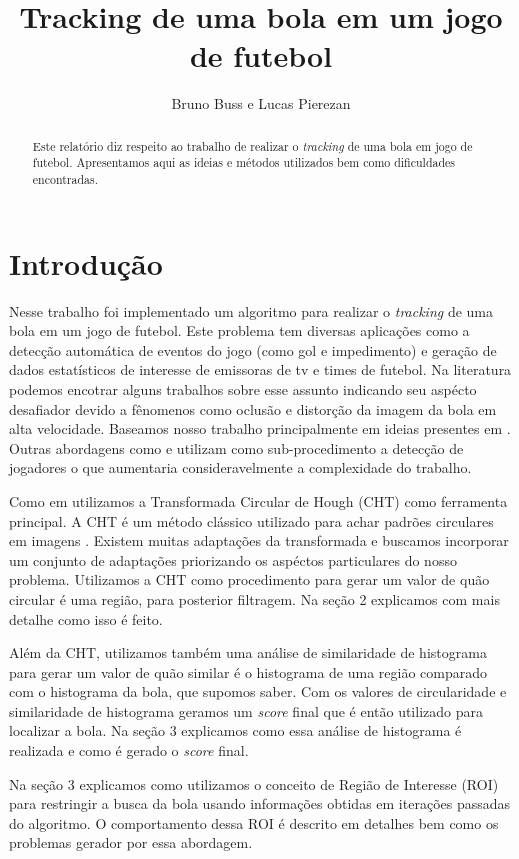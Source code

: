 \documentclass[11pt,a4paper]{article}
\title{Tracking de uma bola em um jogo de futebol}
\author{Bruno Buss e Lucas Pierezan}
\begin{document}
\maketitle

\begin{abstract}
 Este relatório diz respeito ao trabalho de realizar o \textit{tracking} de uma bola em jogo de futebol. Apresentamos aqui as ideias e métodos utilizados bem como dificuldades encontradas.
\end{abstract}

\section{Introdução}
 Nesse trabalho foi implementado um algoritmo para realizar o \textit{tracking} de uma bola em um jogo de futebol. Este problema tem diversas aplicações como a detecção automática de eventos do jogo (como gol e impedimento) e geração de dados estatísticos de interesse de emissoras de tv e times de futebol. Na literatura podemos encotrar alguns trabalhos sobre esse assunto \cite{}\cite{}\cite{} indicando seu aspécto desafiador devido a fênomenos como oclusão e distorção da imagem da bola em alta velocidade. Baseamos nosso trabalho principalmente em ideias presentes em \cite{}. Outras abordagens como \cite{} e \cite{} utilizam como sub-procedimento a detecção de jogadores o que aumentaria consideravelmente a complexidade do trabalho.

Como em \cite{} utilizamos a Transformada Circular de Hough (CHT) como ferramenta principal. A CHT é um método clássico utilizado para achar padrões circulares em imagens \cite{}. Existem muitas adaptações da transformada\cite{} e buscamos incorporar um conjunto de adaptações priorizando os aspéctos particulares do nosso problema. Utilizamos a CHT como procedimento para gerar um valor de quão circular é uma região, para posterior filtragem. Na seção 2 explicamos com mais detalhe como isso é feito.

Além da CHT, utilizamos também uma análise de similaridade de histograma para gerar um valor de quão similar é o histograma de uma região comparado com o histograma da bola, que supomos saber. Com os valores de circularidade e similaridade de histograma geramos um \textit{score} final que é então utilizado para localizar a bola. Na seção 3 explicamos como essa análise de histograma é realizada e como é gerado o \textit{score} final.

Na seção 3 explicamos como utilizamos o conceito de Região de Interesse (ROI) para restringir a busca da bola usando informações obtidas em iterações passadas do algoritmo. O comportamento dessa ROI é descrito em detalhes bem como os problemas gerador por essa abordagem.
\end{document}
